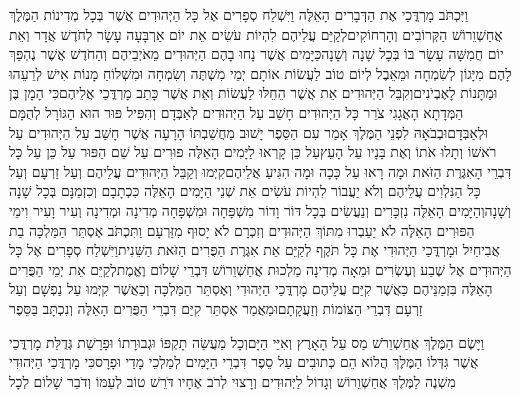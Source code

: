\documentclass[../main/main.tex]{subfiles}
\begin{document}
\begin{multicols}{\ncols}
וַיִּכְתֹּב מָרְדֳּכַי אֶת הַדְּבָרִים הָאֵלֶּה וַיִּשְׁלַח סְפָרִים אֶל כָּל הַיְּהוּדִים אֲשֶׁר בְּכָל מְדִינוֹת הַמֶּלֶךְ אֲחַשְׁוֵרוֹשׁ הַקְּרוֹבִים וְהָרְחוֹקִים\PreVerseSpace{}לְקַיֵּם עֲלֵיהֶם לִהְיוֹת עֹשִׂים אֵת יוֹם אַרְבָּעָה עָשָׂר לְחֹדֶשׁ אֲדָר וְאֵת יוֹם חֲמִשָּׁה עָשָׂר בּוֹ בְּכָל שָׁנָה וְשָׁנָה\PreVerseSpace{}כַּיָּמִים אֲשֶׁר נָחוּ בָהֶם הַיְּהוּדִים מֵאֹיְבֵיהֶם וְהַחֹדֶשׁ אֲשֶׁר נֶהְפַּךְ לָהֶם מִיָּגוֹן לְשִׂמְחָה וּמֵאֵבֶל לְיוֹם טוֹב לַעֲשׂוֹת אוֹתָם יְמֵי מִשְׁתֶּה וְשִׂמְחָה וּמִשְׁלוֹחַ מָנוֹת אִישׁ לְרֵעֵהוּ וּמַתָּנוֹת לָאֶבְיֹנִים\PreVerseSpace{}וְקִבֵּל הַיְּהוּדִים אֵת אֲשֶׁר הֵחֵלּוּ לַעֲשׂוֹת וְאֵת אֲשֶׁר כָּתַב מָרְדֳּכַי אֲלֵיהֶם\PreVerseSpace{}כִּי הָמָן בֶּן הַמְּדָתָא הָאֲגָגִי צֹרֵר כָּל הַיְּהוּדִים חָשַׁב עַל הַיְּהוּדִים לְאַבְּדָם וְהִפִּיל פּוּר הוּא הַגּוֹרָל לְהֻמָּם וּלְאַבְּדָם\PreVerseSpace{}וּבְבֹאָהּ לִפְנֵי הַמֶּלֶךְ אָמַר עִם הַסֵּפֶר יָשׁוּב מַחֲשַׁבְתּוֹ הָרָעָה אֲשֶׁר חָשַׁב עַל הַיְּהוּדִים עַל רֹאשׁוֹ וְתָלוּ אֹתוֹ וְאֶת בָּנָיו עַל הָעֵץ\PreVerseSpace{}עַל כֵּן קָרְאוּ לַיָּמִים הָאֵלֶּה פוּרִים עַל שֵׁם הַפּוּר עַל כֵּן עַל כָּל דִּבְרֵי הָאִגֶּרֶת הַזֹּאת וּמָה רָאוּ עַל כָּכָה וּמָה הִגִּיעַ אֲלֵיהֶם\PreVerseSpace{}קִיְּמוּ וְקַבֵּל הַיְּהוּדִים עֲלֵיהֶם וְעַל זַרְעָם וְעַל כָּל הַנִּלְוִים עֲלֵיהֶם וְלֹא יַעֲבוֹר לִהְיוֹת עֹשִׂים אֵת שְׁנֵי הַיָּמִים הָאֵלֶּה כִּכְתָבָם וְכִזְמַנָּם בְּכָל שָׁנָה וְשָׁנָה\PreVerseSpace{}וְהַיָּמִים הָאֵלֶּה נִזְכָּרִים וְנַעֲשִׂים בְּכָל דּוֹר וָדוֹר מִשְׁפָּחָה וּמִשְׁפָּחָה מְדִינָה וּמְדִינָה וְעִיר וָעִיר וִימֵי הַפּוּרִים הָאֵלֶּה לֹא יַעַבְרוּ מִתּוֹךְ הַיְּהוּדִים וְזִכְרָם לֹא יָסוּף מִזַּרְעָם \ClosedSection{}וַתִּכְתֹּב אֶסְתֵּר הַמַּלְכָּה בַת אֲבִיחַיִל וּמָרְדֳּכַי הַיְּהוּדִי אֶת כָּל תֹּקֶף לְקַיֵּם אֵת אִגֶּרֶת הַפֻּרִים הַזֹּאת הַשֵּׁנִית\PreVerseSpace{}וַיִּשְׁלַח סְפָרִים אֶל כָּל הַיְּהוּדִים אֶל שֶׁבַע וְעֶשְׂרִים וּמֵאָה מְדִינָה מַלְכוּת אֲחַשְׁוֵרוֹשׁ דִּבְרֵי שָׁלוֹם וֶאֱמֶת\PreVerseSpace{}לְקַיֵּם אֵת יְמֵי הַפֻּרִים הָאֵלֶּה בִּזְמַנֵּיהֶם כַּאֲשֶׁר קִיַּם עֲלֵיהֶם מָרְדֳּכַי הַיְּהוּדִי וְאֶסְתֵּר הַמַּלְכָּה וְכַאֲשֶׁר קִיְּמוּ עַל נַפְשָׁם וְעַל זַרְעָם דִּבְרֵי הַצּוֹמוֹת וְזַעֲקָתָם\PreVerseSpace{}וּמַאֲמַר אֶסְתֵּר קִיַּם דִּבְרֵי הַפֻּרִים הָאֵלֶּה וְנִכְתָּב בַּסֵּפֶר\OpenSection{}\par
{}וַיָּשֶׂם הַמֶּלֶךְ אֲחַשְׁוֵרֹשׁ\SubEnd{} מַס עַל הָאָרֶץ וְאִיֵּי הַיָּם\PreVerseSpace{}וְכָל מַעֲשֵׂה תָקְפּוֹ וּגְבוּרָתוֹ וּפָרָשַׁת גְּדֻלַּת מָרְדֳּכַי אֲשֶׁר גִּדְּלוֹ הַמֶּלֶךְ הֲלוֹא הֵם כְּתוּבִים עַל סֵפֶר דִּבְרֵי הַיָּמִים לְמַלְכֵי מָדַי וּפָרָס\PreVerseSpace{}כִּי מָרְדֳּכַי הַיְּהוּדִי מִשְׁנֶה לַמֶּלֶךְ אֲחַשְׁוֵרוֹשׁ וְגָדוֹל לַיְּהוּדִים וְרָצוּי לְרֹב אֶחָיו דֹּרֵשׁ טוֹב לְעַמּוֹ וְדֹבֵר שָׁלוֹם לְכָל\par
\pagebreak
\end{multicols}
\end{document}
